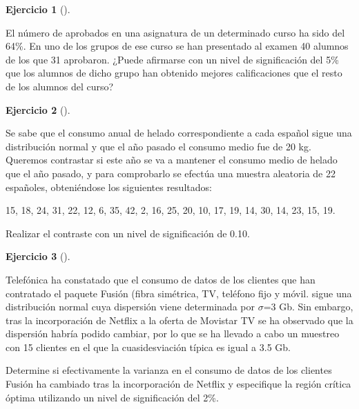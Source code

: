 \documentclass[
  a4paper,
]{scrreport}
\theoremstyle{definition}
\newtheorem{exercise}{Ejercicio}[chapter]
\theoremstyle{remark}
\begin{document}
\begin{exercise}[]\protect\hypertarget{exr-contraste-proporcion-aprobados}{}\label{exr-contraste-proporcion-aprobados}

El número de aprobados en una asignatura de un determinado curso ha sido
del 64\%. En uno de los grupos de ese curso se han presentado al examen
40 alumnos de los que 31 aprobaron. ¿Puede afirmarse con un nivel de
significación del 5\% que los alumnos de dicho grupo han obtenido
mejores calificaciones que el resto de los alumnos del curso?

\end{exercise}

\begin{exercise}[]\protect\hypertarget{exr-contraste-media-consumo}{}\label{exr-contraste-media-consumo}

Se sabe que el consumo anual de helado correspondiente a cada español
sigue una distribución normal y que el año pasado el consumo medio fue
de 20 kg. Queremos contrastar si este año se va a mantener el consumo
medio de helado que el año pasado, y para comprobarlo se efectúa una
muestra aleatoria de 22 españoles, obteniéndose los siguientes
resultados:

15, 18, 24, 31, 22, 12, 6, 35, 42, 2, 16, 25, 20, 10, 17, 19, 14, 30,
14, 23, 15, 19.

Realizar el contraste con un nivel de significación de 0.10.

\end{exercise}

\begin{exercise}[]\protect\hypertarget{exr-contraste-varianza-telefonica}{}\label{exr-contraste-varianza-telefonica}

Telefónica ha constatado que el consumo de datos de los clientes que han
contratado el paquete Fusión (fibra simétrica, TV, teléfono fijo y
móvil. sigue una distribución normal cuya dispersión viene determinada
por \(\sigma\)=3 Gb. Sin embargo, tras la incorporación de Netflix a la
oferta de Movistar TV se ha observado que la dispersión habría podido
cambiar, por lo que se ha llevado a cabo un muestreo con 15 clientes en
el que la cuasidesviación típica es igual a 3.5 Gb.

Determine si efectivamente la varianza en el consumo de datos de los
clientes Fusión ha cambiado tras la incorporación de Netflix y
especifique la región crítica óptima utilizando un nivel de
significación del 2\%.

\end{exercise}
\end{document}
